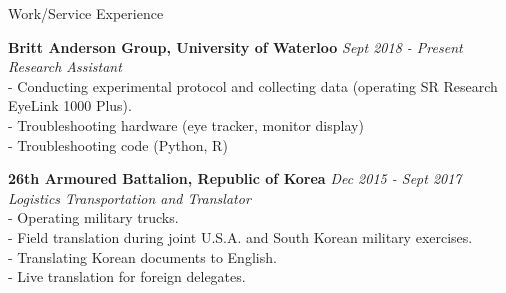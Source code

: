 \documentclass{resume} %
\begin{document}
\begin{rSection}{Work/Service Experience}

	{\bf Britt Anderson Group, University of Waterloo} \hfill {\em Sept 2018 - Present} 
	\\{\textit{Research Assistant}}
	\\- Conducting experimental protocol and collecting data (operating SR Research EyeLink 1000 Plus).
	\\- Troubleshooting hardware (eye tracker, monitor display)
	\\- Troubleshooting code (Python, R)
	
	
	{\bf 26th Armoured Battalion, Republic of Korea } \hfill {\em Dec 2015 - Sept 2017} 
	\\{\textit{Logistics Transportation and Translator}}
	\\- Operating military trucks.
	\\- Field translation during joint U.S.A. and South Korean military exercises.
	\\- Translating Korean documents to English.
	\\- Live translation for foreign delegates.




\end{rSection}




\end{document}
